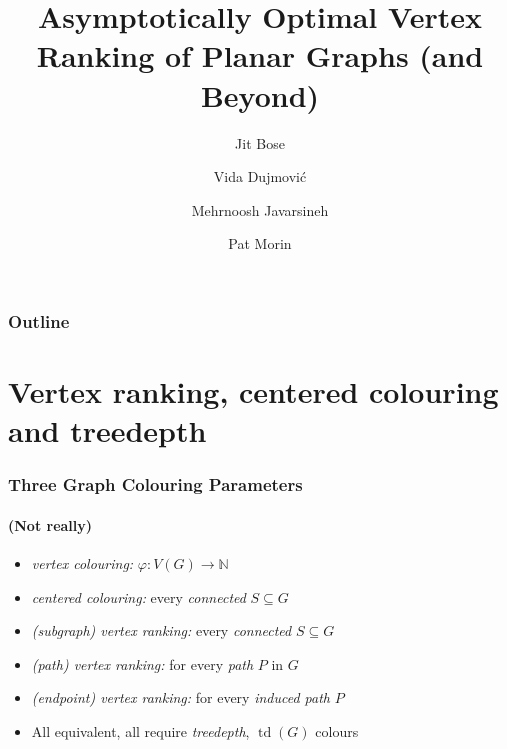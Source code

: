 \documentclass[xcolor=dvipsnames]{beamer}
\title{Asymptotically Optimal Vertex Ranking \newline of Planar Graphs (and Beyond)}
\author{Jit Bose \and Vida Dujmović \and Mehrnoosh Javarsineh \and Pat Morin}
\newcommand{\N}{\mathbb{N}}
\DeclareMathOperator{\td}{td}
\begin{document}
\begin{frame}
  \titlepage
\end{frame}

\begin{frame}
    \frametitle{Outline}

    \tableofcontents
\end{frame}


\section{Vertex ranking, centered colouring and treedepth}

\begin{frame}
  \frametitle{Three Graph Colouring Parameters}
  \framesubtitle{(Not really)}



  \begin{itemize}[<+->]
    \item \emph{vertex colouring:} $\varphi:V(G)\to\N$\vspace{.5cm}
    \begin{center}
    \end{center}

    \item \emph{centered colouring:} every \emph{connected} $S\subseteq G$%

    \item \emph{(subgraph) vertex ranking:} every \emph{connected} $S\subseteq G$%

    \item \emph{(path) vertex ranking:} for every \emph{path} $P$ in $G$%

    \item \emph{(endpoint) vertex ranking:} for every \emph{induced path} $P$%

    \item All equivalent, all require \emph{treedepth}, $\td(G)$ colours
  \end{itemize}
\end{frame}
\end{document}
